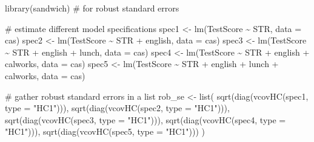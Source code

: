 \documentclass[
  12pt,
  letterpaper,
]{scrbook}
\newenvironment{Shaded}{\begin{snugshade}}{\end{snugshade}}
\newcommand{\AttributeTok}[1]{\textcolor[rgb]{0.40,0.45,0.13}{#1}}
\newcommand{\CommentTok}[1]{\textcolor[rgb]{0.37,0.37,0.37}{#1}}
\newcommand{\FunctionTok}[1]{\textcolor[rgb]{0.28,0.35,0.67}{#1}}
\newcommand{\NormalTok}[1]{\textcolor[rgb]{0.00,0.23,0.31}{#1}}
\newcommand{\OtherTok}[1]{\textcolor[rgb]{0.00,0.23,0.31}{#1}}
\newcommand{\SpecialCharTok}[1]{\textcolor[rgb]{0.37,0.37,0.37}{#1}}
\newcommand{\StringTok}[1]{\textcolor[rgb]{0.13,0.47,0.30}{#1}}
\theoremstyle{plain}
\theoremstyle{definition}
\theoremstyle{remark}
\begin{document}
\begin{Shaded}
\begin{Highlighting}[]
\FunctionTok{library}\NormalTok{(sandwich) }\CommentTok{\# for robust standard errors}

\CommentTok{\# estimate different model specifications}
\NormalTok{spec1 }\OtherTok{\textless{}{-}} \FunctionTok{lm}\NormalTok{(TestScore }\SpecialCharTok{\textasciitilde{}}\NormalTok{ STR, }\AttributeTok{data =}\NormalTok{ cas)}
\NormalTok{spec2 }\OtherTok{\textless{}{-}} \FunctionTok{lm}\NormalTok{(TestScore }\SpecialCharTok{\textasciitilde{}}\NormalTok{ STR }\SpecialCharTok{+}\NormalTok{ english, }\AttributeTok{data =}\NormalTok{ cas)}
\NormalTok{spec3 }\OtherTok{\textless{}{-}} \FunctionTok{lm}\NormalTok{(TestScore }\SpecialCharTok{\textasciitilde{}}\NormalTok{ STR }\SpecialCharTok{+}\NormalTok{ english }\SpecialCharTok{+}\NormalTok{ lunch, }\AttributeTok{data =}\NormalTok{ cas)}
\NormalTok{spec4 }\OtherTok{\textless{}{-}} \FunctionTok{lm}\NormalTok{(TestScore }\SpecialCharTok{\textasciitilde{}}\NormalTok{ STR }\SpecialCharTok{+}\NormalTok{ english }\SpecialCharTok{+}\NormalTok{ calworks, }\AttributeTok{data =}\NormalTok{ cas)}
\NormalTok{spec5 }\OtherTok{\textless{}{-}} \FunctionTok{lm}\NormalTok{(TestScore }\SpecialCharTok{\textasciitilde{}}\NormalTok{ STR }\SpecialCharTok{+}\NormalTok{ english }\SpecialCharTok{+}\NormalTok{ lunch }\SpecialCharTok{+}\NormalTok{ calworks, }\AttributeTok{data =}\NormalTok{ cas)}

\CommentTok{\# gather robust standard errors in a list}
\NormalTok{rob\_se }\OtherTok{\textless{}{-}} \FunctionTok{list}\NormalTok{(}
    \FunctionTok{sqrt}\NormalTok{(}\FunctionTok{diag}\NormalTok{(}\FunctionTok{vcovHC}\NormalTok{(spec1, }\AttributeTok{type =} \StringTok{"HC1"}\NormalTok{))),}
    \FunctionTok{sqrt}\NormalTok{(}\FunctionTok{diag}\NormalTok{(}\FunctionTok{vcovHC}\NormalTok{(spec2, }\AttributeTok{type =} \StringTok{"HC1"}\NormalTok{))),}
    \FunctionTok{sqrt}\NormalTok{(}\FunctionTok{diag}\NormalTok{(}\FunctionTok{vcovHC}\NormalTok{(spec3, }\AttributeTok{type =} \StringTok{"HC1"}\NormalTok{))),}
    \FunctionTok{sqrt}\NormalTok{(}\FunctionTok{diag}\NormalTok{(}\FunctionTok{vcovHC}\NormalTok{(spec4, }\AttributeTok{type =} \StringTok{"HC1"}\NormalTok{))),}
    \FunctionTok{sqrt}\NormalTok{(}\FunctionTok{diag}\NormalTok{(}\FunctionTok{vcovHC}\NormalTok{(spec5, }\AttributeTok{type =} \StringTok{"HC1"}\NormalTok{)))}
\NormalTok{)}


\end{Highlighting}
\end{Shaded}
\end{document}

